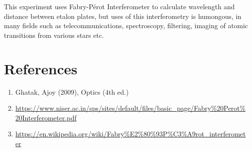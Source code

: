 \documentclass[a4paper, amsfonts, amssymb, amsmath, reprint, showkeys, nofootinbib, twoside]{revtex4-1}
\begin{document}
This experiment uses Fabry-Pérot Interferometer to calculate wavelength and distance between etalon plates, but uses of this interferometry is humongous, in many fields such as telecommunications, spectroscopy, filtering, imaging of atomic transitions from various stars etc.

\section{References}
\begin{enumerate}
\item{Ghatak, Ajoy (2009), Optics (4th ed.)}
\item{\url{https://www.niser.ac.in/sps/sites/default/files/basic_page/Fabry%20Perot%20Interferometer.pdf}}
\item{\url{https://en.wikipedia.org/wiki/Fabry%E2%80%93P%C3%A9rot_interferometer}}
\end{enumerate}
\end{document}
